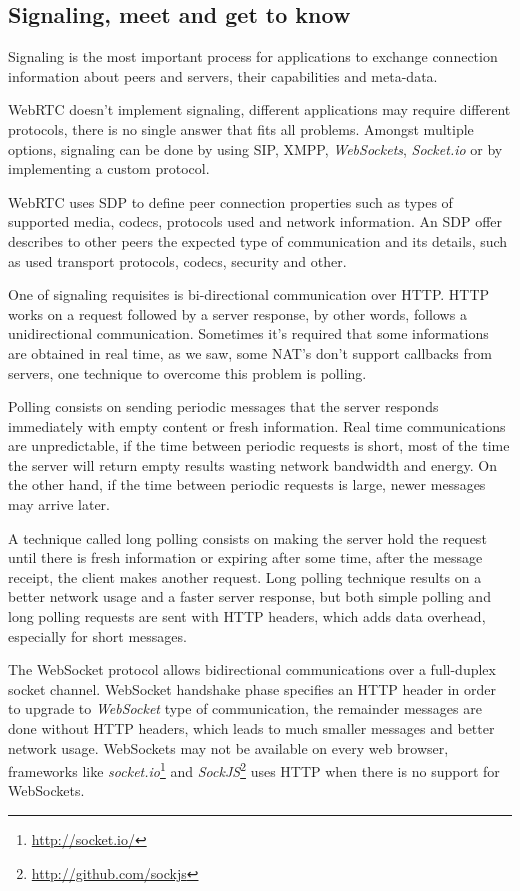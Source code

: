 \subsection{Signaling, meet and get to know}\label{signaling}


  Signaling is the most important process for applications to exchange connection information about peers and servers, their capabilities and meta-data.

  \ac{WebRTC} doesn't implement signaling, different applications may require different protocols, there is no single answer that fits all problems. Amongst multiple options, signaling can be done by using \ac{SIP}, \ac{XMPP}, \emph{WebSockets}, \emph{Socket.io} or by implementing a custom protocol.

  \ac{WebRTC} uses \ac{SDP} \cite{rfc4566} to define peer connection properties such as types of supported media, codecs, protocols used and network information. An \ac{SDP} offer describes to other peers the expected type of communication and its details, such as used transport protocols, codecs, security and other.

  One of signaling requisites is bi-directional communication over \ac{HTTP}. \ac{HTTP} works on a request followed by a server response, by other words, follows a unidirectional communication. Sometimes it's required that some informations are obtained in real time, as we saw, some \ac{NAT}'s don't support callbacks from servers, one technique to overcome this problem is polling.

  Polling consists on sending periodic messages that the server responds immediately with empty content or fresh information. Real time communications are unpredictable, if the time between periodic requests is short, most of the time the server will return empty results wasting network bandwidth and energy. On the other hand, if the time between periodic requests is large, newer messages may arrive later.

  A technique called long polling consists on making the server hold the request until there is fresh information or expiring after some time, after the message receipt, the client makes another request. Long polling technique results on a better network usage and a faster server response, but both simple polling and long polling requests are sent with \ac{HTTP} headers, which adds data overhead, especially for short messages.

  The WebSocket protocol \cite{rfc6455} allows bidirectional communications over a full-duplex socket channel. WebSocket handshake phase specifies an \ac{HTTP} header in order to upgrade to \emph{WebSocket} type of communication, the remainder messages are done without \ac{HTTP} headers, which leads to much smaller messages and better network usage. WebSockets may not be available on every web browser, frameworks like \emph{socket.io}\footnote{\url{http://socket.io/}} and \emph{SockJS}\footnote{\url{http://github.com/sockjs}} uses \ac{HTTP} when there is no support for WebSockets. 

